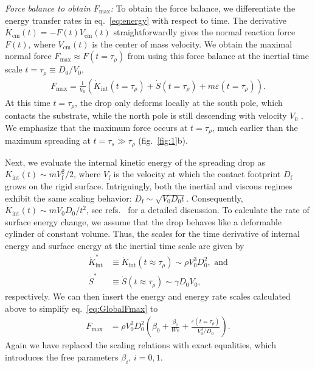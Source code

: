 \documentclass[preprint,amssymb,superscriptaddress,aps,prl,floatfix]{revtex4-1}
\begin{document}
{\it Force balance to obtain $F_\text{max}$:}
To obtain the force balance, we differentiate  the energy transfer rates in eq.~\eqref{eq:energy} with respect to time. The derivative 
$\dot{K}_{\text{cm}}(t) = -F(t)V_{\text{cm}}(t)$ straightforwardly gives
the normal reaction force  $F(t)$, where  $V_{\text{cm}}(t)$ is the center of mass velocity.  We obtain the 
maximal normal  force $F_{\text{max}} \approx F (t= \tau_\rho )$
from using this  force balance at 
the inertial time scale $t = \tau_\rho \equiv D_0/V_0$,
\begin{align}
	\label{eq:GlobalFmax}
	F_{\text{max}} = \frac{1}{V_0}\left(\dot{K}_{\text{int}}(t = \tau_\rho) + \dot{S}(t = \tau_\rho) + m\varepsilon(t = \tau_\rho)\right). 
\end{align}
At this time $t= \tau_\rho$, the drop only deforms locally at the south pole, which contacts the substrate, while the north pole is still descending with velocity $V_0$ \cite{Eggers2010, sanjayzhang2022prl}. 
We emphasize that the maximum force occurs 
at $t = \tau_\rho$, much earlier than  
the maximum spreading at $t = \tau_s \gg \tau_\rho$ (fig.~\ref{fig:1}b). 

 Next, we  evaluate the internal kinetic energy of the spreading drop as $K_{\text{int}}(t) \sim mV_{\text{f}}^2/2$, where $V_{\text{f}}$ is the velocity at which the contact footprint $D_{\text{f}}$ grows on the rigid surface. Intriguingly, both the inertial \cite{wagner1932stoss, mandre2009precursors} and viscous \cite{hertz1881contact, langley2017impact, bilotto2023fluid, bertin2024similarity} regimes exhibit the same scaling behavior: $D_{\text{f}} \sim \sqrt{V_0D_0t}$. Consequently, $\dot{K}_{\text{int}}(t) \sim mV_0D_0/t^2$, see refs.\ 
 \cite{Philippi2016, supplMaterial} for a detailed discussion. To calculate the rate of surface energy change, we assume that  the drop behaves like a deformable cylinder of constant volume. Thus, the scales for the 
 time derivative 
 of internal energy and surface energy at the inertial time scale are given by
\begin{align}
	\dot{K}_{\text{int}}^* &\equiv \dot{K}_{\text{int}}(t \approx \tau_\rho) \sim \rho V_0^3D_0^2,\,\,\text{and}\\
	\dot{S}^* &\equiv \dot{S}(t \approx \tau_\rho) \sim \gamma D_0V_0,
\end{align}
respectively. We can then insert the energy and energy rate scales calculated above to simplify 
eq.\ \eqref{eq:GlobalFmax} to 
\begin{align}
	\label{eq:GlobalFmax_v2}
	F_{\text{max}} &= \rho V_0^2D_0^2\left(\beta_0 + \frac{\beta_1}{We} + \frac{\varepsilon(t = \tau_\rho)}{V_0^3/D_0}\right). 
\end{align}
Again we have replaced the scaling relations with exact equalities, which  introduces the free parameters  
$\beta_i$, $i=0,1$. 
\end{document}
